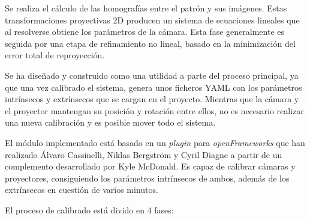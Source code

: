 Se realiza el cálculo de las homografías entre el patrón y sus imágenes. Estas transformaciones proyectivas 2D producen un sistema de ecuaciones lineales que al resolverse obtiene los parámetros de la cámara. Esta fase generalmente es seguida por una etapa de refinamiento no lineal, basado en la minimización del error total de reproyección.

Se ha diseñado y construido como una utilidad a parte del proceso principal, ya que una vez calibrado el sistema, genera unos ficheros YAML con los parámetros intrínsecos y extrínsecos que se cargan en el proyecto. Mientras que la cámara y el proyector mantengan su posición y rotación entre ellos, no es necesario realizar una nueva calibración y es posible mover todo el sistema.

El módulo implementado está basado en un \textit{plugin} para \textit{openFrameworks} que han realizado Álvaro Cassinelli, Niklas Bergström y Cyril Diagne a partir de un complemento desarrollado por Kyle McDonald. Es capaz de calibrar cámaras y proyectores, consiguiendo los parámetros intrínsecos de ambos, además de los extrínsecos en cuestión de varios minutos. 

El proceso de calibrado está divido en 4 fases:

